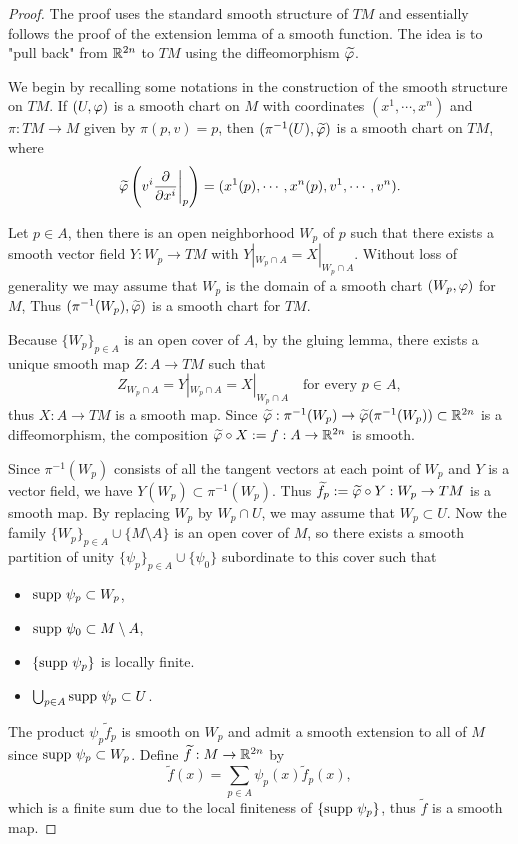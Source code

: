 \begin{proof}
    The proof uses the standard smooth structure of $TM$ and essentially follows the proof of the extension lemma of a smooth function. The idea is to "pull back" from $\mathbb{R}^{2n}$ to $TM$ using the diffeomorphism $\widetilde{\varphi}$. 
    
    We begin by recalling some notations in the construction of the smooth structure on $TM$. If $(U, \varphi)$ is a smooth chart on $M$ with coordinates $(x^1, \cdots, x^n)$ and $\pi:TM \to M$ given by $\pi(p,v) = p$, then $(\pi^{-1}(U), \widetilde{\varphi})$ is a smooth chart on $TM$, where 
    $$ \widetilde{\varphi}\left(v^i \pdv{}{x^i}\bigg|_p\right) = 
        (x^1(p), \cdots, x^n(p), v^1, \cdots, v^n). $$

    Let $p \in A$, then there is an open neighborhood $W_p$ of $p$ such that there exists a smooth vector field $Y:W_p \to TM$ with $Y|_{W_p \cap A} = X|_{W_p \cap A}$. Without loss of generality we may assume that $W_p$ is the domain of a smooth chart $(W_p,\varphi)$ for $M$, Thus $(\pi^{-1}(W_p), \widetilde{\varphi})$ is a smooth chart for $TM$.
    
    Because $\{W_p\}_{p \in A}$ is an open cover of $A$, by the gluing lemma, there exists a unique smooth map $Z:A \to TM$ such that  
    $$ Z_{W_p \cap A} = Y|_{W_p \cap A} = X|_{W_p \cap A} \quad \text{for every }p \in A, $$
    thus $X:A \to TM$ is a smooth map. Since $\widetilde{\varphi}:\pi^{-1}(W_p) \to \widetilde{\varphi}(\pi^{-1}(W_p)) \subset \mathbb{R}^{2n}$ is a diffeomorphism, 
    the composition $\widetilde{\varphi} \circ X := f:A \to \mathbb{R}^{2n}$ is smooth.
    
    Since $\pi^{-1}(W_p)$ consists of all the tangent vectors at each point of $W_p$ and $Y$ is a vector field, we have $Y(W_p) \subset \pi^{-1}(W_p)$. Thus $\widetilde{f}_p := \widetilde{\varphi} \circ Y: W_p \to TM$ is a smooth map. By replacing $W_p$ by $W_p \cap U$, we may assume that $W_p \subset U$. 
    Now the family $\{W_p\}_{p \in A} \cup \{M \setminus A\}$ is an open cover of $M$, so there exists a smooth partition of unity $\{\psi_p\}_{p\in A} \cup \{\psi_0\}$ subordinate to this cover such that 
    \begin{itemize}
        \item $\mathrm{supp~} \psi_p \subset W_p$,
        \item $\mathrm{supp~} \psi_0 \subset M \setminus A$,
        \item $\{\mathrm{supp~} \psi_p\}$ is locally finite. 
        \item $\bigcup_{p \in A}\mathrm{supp~} \psi_p \subset U$.
    \end{itemize}
    The product $\psi_p \widetilde{f}_p$ is smooth on $W_p$ and admit a smooth extension to all of $M$ since $\mathrm{supp~} \psi_p \subset W_p$. Define 
    $\widetilde{f}:M \to \mathbb{R}^{2n}$ by
    $$\widetilde{f}(x) = \sum_{p \in A} \psi_p(x) \widetilde{f}_p(x), $$
    which is a finite sum due to the local finiteness of $\{\mathrm{supp~} \psi_p\}$, thus $\widetilde{f}$ is a smooth map. 


\end{proof}
